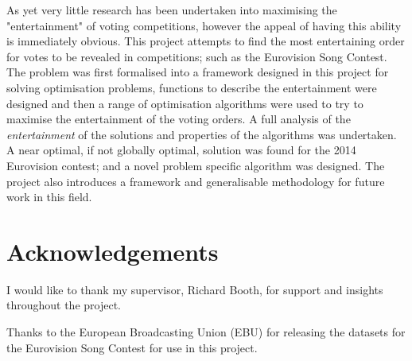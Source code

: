 \documentclass[12pt]{report}
\begin{document}

As yet very little research has been undertaken into maximising the "entertainment" of voting competitions, however the appeal of having this ability is immediately obvious. This project attempts to find the most entertaining order for votes to be revealed in competitions; such as the Eurovision Song Contest. The problem was first formalised into a framework designed in this project for solving optimisation problems, functions to describe the entertainment were designed and then a range of optimisation algorithms were used to try to maximise the entertainment of the voting orders. A full analysis of the \textit{entertainment} of the solutions and properties of the algorithms was undertaken. A near optimal, if not globally optimal, solution was found for the 2014 Eurovision contest; and a novel problem specific algorithm was designed. The project also introduces a framework and generalisable methodology for future work in this field.

\section*{Acknowledgements}
I would like to thank my supervisor, Richard Booth, for support and insights throughout the project.

Thanks to the European Broadcasting Union (EBU) for releasing the datasets for the Eurovision Song Contest for use in this project.

\tableofcontents %
\listoffigures
\listoftables
\clearpage %

\end{document}
